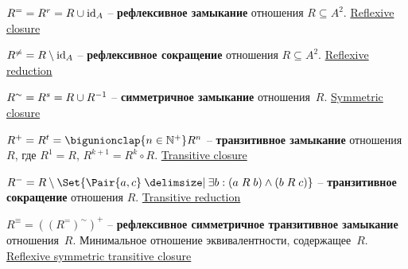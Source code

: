 \documentclass[a4paper,10pt]{article}
\begin{document}
\begin{terms}
    \begin{terms}
        \item $R^{=} = R^{r} = R \cup \mathrm{id}_{A}$ \--- \textbf{рефлексивное замыкание} отношения $R \subseteq A^2$.
        \hfill\href{https://en.wikipedia.org/wiki/Reflexive_closure}{Reflexive closure}


        \item $R^{\neq} = R \setminus \mathrm{id}_{A}$ \--- \textbf{рефлексивное сокращение} отношения $R \subseteq A^2$.
        \hfill\href{https://en.wikipedia.org/wiki/Reflexive_reduction}{Reflexive reduction}


        \item $R^{\sim} = R^{s} = R \cup R^{-1}$ \--- \textbf{симметричное замыкание} отношения~$R$.
        \hfill\href{https://en.wikipedia.org/wiki/Symmetric_closure}{Symmetric closure}

        \item $R^{+} = R^{t} = \bigunionclap{n \in \NaturalPlus} R^n$ \--- \textbf{транзитивное замыкание} отношения $R$, где $R^1 = R$, $R^{k+1} = R^k \circ R$.
        \hfill\href{https://en.wikipedia.org/wiki/Transitive_closure}{Transitive closure}

        \item $R^{-} = R \setminus \Set{\Pair{a,c} \given \exists b : (a \rel b) \land (b \rel c)}$ \--- \textbf{транзитивное сокращение} отношения $R$.
        \hfill\href{https://en.wikipedia.org/wiki/Transitive_reduction}{Transitive reduction}

        \item $R^{\equiv} = ((R^{=})^{\sim})^{+}$ \--- \textbf{рефлексивное симметричное транзитивное замыкание} отношения~$R$. Минимальное отношение эквивалентности, содержащее~$R$.
        \hfill\href{https://en.wikipedia.org/wiki/Reflexive_symmetric_transitive_closure}{Reflexive symmetric transitive closure}
    \end{terms}
\end{terms}
\end{document}
